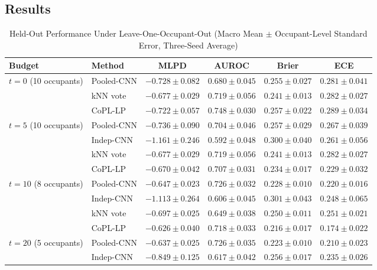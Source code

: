 \documentclass[conference]{IEEEtran}
\newcommand{\method}{CoPL-LP}
\begin{document}
\subsection{Results}
\label{sec:results}

\begin{table}[t]
\caption{Held-Out Performance Under Leave-One-Occupant-Out (Macro Mean $\pm$ Occupant-Level Standard Error, Three-Seed Average)}
\label{tab:main}
\centering
\setlength{\tabcolsep}{5pt}
\begin{tabular}{llcccc}
\toprule
Budget & Method & MLPD & AUROC & Brier & ECE \\
\midrule
\multirow{3}{*}{$t=0$ (10 occupants)}
 & Pooled-CNN & $-0.728\pm0.082$ & $0.680\pm0.045$ & $0.255\pm0.027$ & $0.281\pm0.041$ \\
 & kNN vote   & $\mathbf{-0.677}\pm0.029$ & $0.719\pm0.056$ & $\mathbf{0.241}\pm0.013$ & $0.282\pm0.027$ \\
 & \method{}  & $-0.722\pm0.057$ & $\mathbf{0.748}\pm0.030$ & $0.257\pm0.022$ & $0.289\pm0.034$ \\
\midrule
\multirow{4}{*}{$t=5$ (10 occupants)}
 & Pooled-CNN & $-0.736\pm0.090$ & $0.704\pm0.046$ & $0.257\pm0.029$ & $0.267\pm0.039$ \\
 & Indep-CNN  & $-1.161\pm0.246$ & $0.592\pm0.048$ & $0.300\pm0.040$ & $0.261\pm0.056$ \\
 & kNN vote   & $-0.677\pm0.029$ & $\mathbf{0.719}\pm0.056$ & $0.241\pm0.013$ & $0.282\pm0.027$ \\
 & \method{}  & $\mathbf{-0.670}\pm0.042$ & $0.707\pm0.031$ & $\mathbf{0.234}\pm0.017$ & $\mathbf{0.229}\pm0.032$ \\
\midrule
\multirow{4}{*}{$t=10$ (8 occupants)}
 & Pooled-CNN & $-0.647\pm0.023$ & $\mathbf{0.726}\pm0.032$ & $0.228\pm0.010$ & $0.220\pm0.016$ \\
 & Indep-CNN  & $-1.113\pm0.264$ & $0.606\pm0.045$ & $0.301\pm0.043$ & $0.248\pm0.065$ \\
 & kNN vote   & $-0.697\pm0.025$ & $0.649\pm0.038$ & $0.250\pm0.011$ & $0.251\pm0.021$ \\
 & \method{}  & $\mathbf{-0.626}\pm0.040$ & $0.718\pm0.033$ & $\mathbf{0.216}\pm0.017$ & $\mathbf{0.174}\pm0.022$ \\
\midrule
\multirow{4}{*}{$t=20$ (5 occupants)}
 & Pooled-CNN & $-0.637\pm0.025$ & $0.726\pm0.035$ & $0.223\pm0.010$ & $0.210\pm0.023$ \\
 & Indep-CNN  & $-0.849\pm0.125$ & $0.617\pm0.042$ & $0.256\pm0.017$ & $0.235\pm0.026$ \\

\end{tabular}
\end{table}
\end{document}
